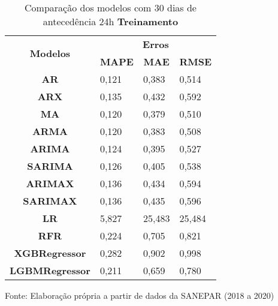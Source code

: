 \begin{table}[H]
	\centering
	\caption{Comparação dos modelos com 30 dias de antecedência 24h \textbf{Treinamento} }\label{tb:60-24trn}
	\begin{tabular}{@{}clll@{}}
		\toprule
		\multirow{2}{*}{\textbf{Modelos}} & \multicolumn{3}{c}{\textbf{Erros}}                                                                       \\ \cmidrule(l){2-4} 
		& \multicolumn{1}{c}{\textbf{MAPE}} & \multicolumn{1}{c}{\textbf{MAE}} & \multicolumn{1}{c}{\textbf{RMSE}} \\ \hline
\textbf{AR}                       & 0,121                             & 0,383                            & 0,514                             \\
\textbf{ARX}                      & 0,135                             & 0,432                            & 0,592                             \\
\textbf{MA}                       & 0,120                             & 0,379                            & 0,510                             \\
\textbf{ARMA}                     & 0,120                             & 0,383                            & 0,508                             \\
\textbf{ARIMA}                    & 0,124                             & 0,395                            & 0,527                             \\
\textbf{SARIMA}                   & 0,126                             & 0,405                            & 0,538                             \\
\textbf{ARIMAX}                   & 0,136                             & 0,434                            & 0,594                             \\
\textbf{SARIMAX}                  & 0,136                             & 0,435                            & 0,596                             \\
\textbf{LR}                       & 5,827                             & 25,483                           & 25,484                            \\
\textbf{RFR}                      & 0,224                             & 0,705                            & 0,821                             \\
\textbf{XGBRegressor}             & 0,282                             & 0,902                            & 0,998                             \\
\textbf{LGBMRegressor}            & 0,211                             & 0,659                            & 0,780                             \\ \bottomrule
	\end{tabular}

Fonte: Elaboração própria a partir de dados da SANEPAR (2018 a 2020)
\end{table}

